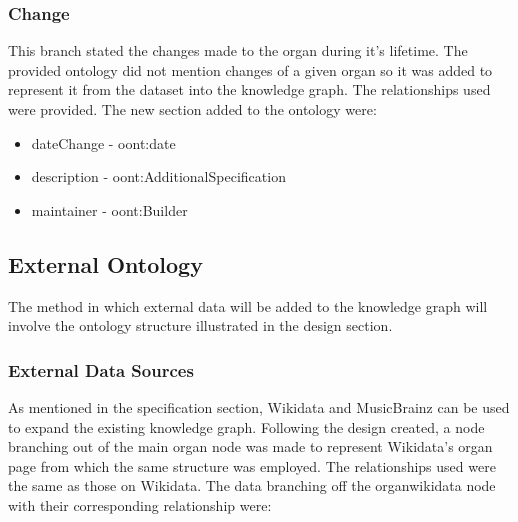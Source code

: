 \subsubsection{Change}
\hspace*{0.5cm} This branch stated the changes made to the organ during it's lifetime. The provided ontology did not mention changes of a given organ so it was added to represent it from the dataset into the knowledge graph. The relationships used were provided. The new section added to the ontology were:

\begin{itemize}
    \itemsep0em 
    \item dateChange - oont:date 
    \item description - oont:AdditionalSpecification
    \item maintainer - oont:Builder
\end{itemize}

\subsection{External Ontology}
\hspace*{0.5cm} The method in which external data will be added to the knowledge graph will involve the ontology structure illustrated in the design section.

\subsubsection{External Data Sources}
\hspace*{0.5cm} As mentioned in the specification section, Wikidata and MusicBrainz can be used to expand the existing knowledge graph. Following the design created, a node branching out of the main organ node was made to represent Wikidata's organ page \cite{organwikidata} from which the same structure was employed. The relationships used were the same as those on Wikidata. The data branching off the organwikidata node with their corresponding relationship were:

